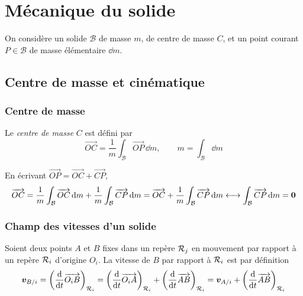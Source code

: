 
\section{Mécanique du solide}

On considère un solide $\mathcal{B}$ de masse $m$, de centre de masse
$C$, et un point courant $P\in\mathcal{B}$ de masse élémentaire
$\dd m$.

\subsection{Centre de masse et cinématique}

\subsubsection{Centre de masse}

\begin{definition}
    Le \emph{centre de masse} $C$ est défini par
    \[
        \overrightarrow{OC}
        = \frac{1}{m}\int_{\mathcal{B}} \overrightarrow{OP}\,\dd m,
        \qquad m = \int_{\mathcal{B}} \dd m
    \]
\end{definition}

En écrivant $\overrightarrow{OP} = \overrightarrow{OC}
+ \overrightarrow{CP}$,
\[
    \overrightarrow{OC}
    = \frac{1}{m}\int_{\mathcal{B}} \overrightarrow{OC}\,\mathrm{d} m
    + \frac{1}{m}\int_{\mathcal{B}} \overrightarrow{CP}\,\mathrm{d} m
    = \overrightarrow{OC}
    + \frac{1}{m}\int_{\mathcal{B}} \overrightarrow{CP}\,\mathrm{d} m
    \longleftrightarrow
    \int_{\mathcal{B}} \overrightarrow{CP}\,\mathrm{d} m = \bm{0}
\]

\subsubsection{Champ des vitesses d'un solide}

Soient deux points $A$ et $B$ fixes dans un repère $\mathcal{R}_{j}$ en
mouvement par rapport à un repère $\mathcal{R}_{i}$ d'origine $O_i$. La vitesse
de $B$ par rapport à $\mathcal{R}_{i}$ est par définition
\[
    \bm{v}_{B/i}
    = \left(\frac{\mathrm{d}}{\mathrm{d} t}\overrightarrow{O_iB}\right)_{\mathcal{R}_{i}}
    = \left(\frac{\mathrm{d}}{\mathrm{d} t}\overrightarrow{O_iA}\right)_{\mathcal{R}_{i}}
    + \left(\frac{\mathrm{d}}{\mathrm{d} t}\overrightarrow{AB}\right)_{\mathcal{R}_{i}}
    = \bm{v}_{A/i}
    + \left(\frac{\mathrm{d}}{\mathrm{d} t}\overrightarrow{AB}\right)_{\mathcal{R}_{i}}
\]

